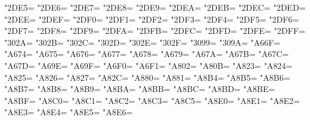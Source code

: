 \XeTeXcharclass"2DE5=\KclassCM
\XeTeXcharclass"2DE6=\KclassCM
\XeTeXcharclass"2DE7=\KclassCM
\XeTeXcharclass"2DE8=\KclassCM
\XeTeXcharclass"2DE9=\KclassCM
\XeTeXcharclass"2DEA=\KclassCM
\XeTeXcharclass"2DEB=\KclassCM
\XeTeXcharclass"2DEC=\KclassCM
\XeTeXcharclass"2DED=\KclassCM
\XeTeXcharclass"2DEE=\KclassCM
\XeTeXcharclass"2DEF=\KclassCM
\XeTeXcharclass"2DF0=\KclassCM
\XeTeXcharclass"2DF1=\KclassCM
\XeTeXcharclass"2DF2=\KclassCM
\XeTeXcharclass"2DF3=\KclassCM
\XeTeXcharclass"2DF4=\KclassCM
\XeTeXcharclass"2DF5=\KclassCM
\XeTeXcharclass"2DF6=\KclassCM
\XeTeXcharclass"2DF7=\KclassCM
\XeTeXcharclass"2DF8=\KclassCM
\XeTeXcharclass"2DF9=\KclassCM
\XeTeXcharclass"2DFA=\KclassCM
\XeTeXcharclass"2DFB=\KclassCM
\XeTeXcharclass"2DFC=\KclassCM
\XeTeXcharclass"2DFD=\KclassCM
\XeTeXcharclass"2DFE=\KclassCM
\XeTeXcharclass"2DFF=\KclassCM
\XeTeXcharclass"302A=\KclassCM
\XeTeXcharclass"302B=\KclassCM
\XeTeXcharclass"302C=\KclassCM
\XeTeXcharclass"302D=\KclassCM
\XeTeXcharclass"302E=\KclassCM
\XeTeXcharclass"302F=\KclassCM
\XeTeXcharclass"3099=\KclassCM
\XeTeXcharclass"309A=\KclassCM
\XeTeXcharclass"A66F=\KclassCM
\XeTeXcharclass"A674=\KclassCM
\XeTeXcharclass"A675=\KclassCM
\XeTeXcharclass"A676=\KclassCM
\XeTeXcharclass"A677=\KclassCM
\XeTeXcharclass"A678=\KclassCM
\XeTeXcharclass"A679=\KclassCM
\XeTeXcharclass"A67A=\KclassCM
\XeTeXcharclass"A67B=\KclassCM
\XeTeXcharclass"A67C=\KclassCM
\XeTeXcharclass"A67D=\KclassCM
\XeTeXcharclass"A69E=\KclassCM
\XeTeXcharclass"A69F=\KclassCM
\XeTeXcharclass"A6F0=\KclassCM
\XeTeXcharclass"A6F1=\KclassCM
\XeTeXcharclass"A802=\KclassCM
\XeTeXcharclass"A80B=\KclassCM
\XeTeXcharclass"A823=\KclassCM
\XeTeXcharclass"A824=\KclassCM
\XeTeXcharclass"A825=\KclassCM
\XeTeXcharclass"A826=\KclassCM
\XeTeXcharclass"A827=\KclassCM
\XeTeXcharclass"A82C=\KclassCM
\XeTeXcharclass"A880=\KclassCM
\XeTeXcharclass"A881=\KclassCM
\XeTeXcharclass"A8B4=\KclassCM
\XeTeXcharclass"A8B5=\KclassCM
\XeTeXcharclass"A8B6=\KclassCM
\XeTeXcharclass"A8B7=\KclassCM
\XeTeXcharclass"A8B8=\KclassCM
\XeTeXcharclass"A8B9=\KclassCM
\XeTeXcharclass"A8BA=\KclassCM
\XeTeXcharclass"A8BB=\KclassCM
\XeTeXcharclass"A8BC=\KclassCM
\XeTeXcharclass"A8BD=\KclassCM
\XeTeXcharclass"A8BE=\KclassCM
\XeTeXcharclass"A8BF=\KclassCM
\XeTeXcharclass"A8C0=\KclassCM
\XeTeXcharclass"A8C1=\KclassCM
\XeTeXcharclass"A8C2=\KclassCM
\XeTeXcharclass"A8C3=\KclassCM
\XeTeXcharclass"A8C5=\KclassCM
\XeTeXcharclass"A8E0=\KclassCM
\XeTeXcharclass"A8E1=\KclassCM
\XeTeXcharclass"A8E2=\KclassCM
\XeTeXcharclass"A8E3=\KclassCM
\XeTeXcharclass"A8E4=\KclassCM
\XeTeXcharclass"A8E5=\KclassCM
\XeTeXcharclass"A8E6=\KclassCM
